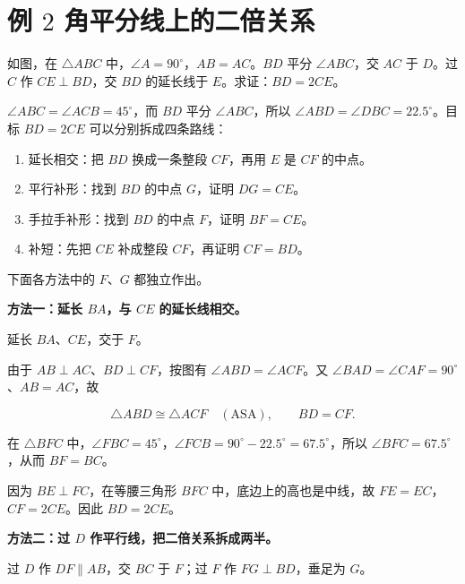 \section{\texorpdfstring{例 $2$ 角平分线上的二倍关系}{例 2 角平分线上的二倍关系}}

如图，在 $\triangle ABC$ 中，$\angle A=90^\circ$，$AB=AC$。$BD$ 平分 $\angle ABC$，交 $AC$ 于 $D$。过 $C$ 作 $CE\perp BD$，交 $BD$ 的延长线于 $E$。求证：$BD=2$$CE$。

\esdiagram{\esdiExample}

\think

$\angle ABC=\angle ACB=45^\circ$，而 $BD$ 平分 $\angle ABC$，所以 $\angle ABD=\angle DBC=22.5^\circ$。目标 $BD=2$$CE$ 可以分别拆成四条路线：

\begin{enumerate}
\item 延长相交：把 $BD$ 换成一条整段 $CF$，再用 $E$ 是 $CF$ 的中点。
\item 平行补形：找到 $BD$ 的中点 $G$，证明 $DG=CE$。
\item 手拉手补形：找到 $BD$ 的中点 $F$，证明 $BF=CE$。
\item 补短：先把 $CE$ 补成整段 $CF$，再证明 $CF=BD$。
\end{enumerate}

下面各方法中的 $F$、$G$ 都独立作出。

\textbf{方法一：延长 $BA$，与 $CE$ 的延长线相交。}

延长 $BA$、$CE$，交于 $F$。

\esdiagram{\esdiExampleExtend}

由于 $AB\perp AC$、$BD\perp CF$，按图有 $\angle ABD=\angle ACF$。又 $\angle BAD=\angle CAF=90^\circ$、$AB=AC$，故

\[
\triangle ABD\cong\triangle ACF\quad(\mathrm{ASA}),
\qquad BD=CF.
\]

在 $\triangle BFC$ 中，$\angle FBC=45^\circ$，$\angle FCB=90^\circ-22.5^\circ=67.5^\circ$，所以 $\angle BFC=67.5^\circ$，从而 $BF=BC$。

因为 $BE\perp FC$，在等腰三角形 $BFC$ 中，底边上的高也是中线，故 $FE=EC$，$CF=2$$CE$。因此 $BD=2$$CE$。

\textbf{方法二：过 $D$ 作平行线，把二倍关系拆成两半。}

过 $D$ 作 $DF\parallel AB$，交 $BC$ 于 $F$；过 $F$ 作 $FG\perp BD$，垂足为 $G$。

\esdiagram{\esdiExampleParallel}

